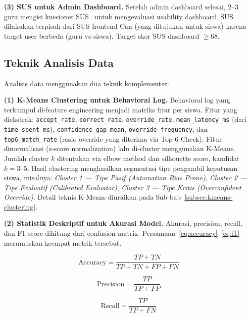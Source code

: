 \documentclass[12pt,a4paper,oneside,openany]{report}
\begin{document}
\textbf{(3) SUS untuk Admin Dashboard.} Setelah admin dashboard selesai, 2--3 guru mengisi kuesioner SUS~\cite{ref15}\cite{ref16} untuk mengevaluasi usability dashboard. SUS dilakukan terpisah dari SUS frontend Can (yang ditujukan untuk siswa) karena target user berbeda (guru vs siswa). Target skor SUS dashboard $\geq 68$.

\subsection{Teknik Analisis Data}
\label{subsec:teknik-analisis-data}

Analisis data menggunakan dua teknik komplementer:

\textbf{(1) K-Means Clustering untuk Behavioral Log.} Behavioral log yang terkumpul di-feature engineering menjadi matriks fitur per siswa. Fitur yang diekstrak: \texttt{accept\_rate}, \texttt{correct\_rate}, \texttt{override\_rate}, \texttt{mean\_latency\_ms} (dari \texttt{time\_spent\_ms}), \texttt{confidence\_gap\_mean}, \texttt{override\_frequency}, dan \texttt{top6\_match\_rate} (rasio override yang diterima via Top-6 Check). Fitur dinormalisasi (z-score normalization) lalu di-cluster menggunakan K-Means. Jumlah cluster $k$ ditentukan via elbow method dan silhouette score, kandidat $k = 3$--$5$. Hasil clustering menghasilkan segmentasi tipe pengambil keputusan siswa, misalnya: \textit{Cluster 1 --- Tipe Pasif (Automation Bias Prone)}, \textit{Cluster 2 --- Tipe Evaluatif (Calibrated Evaluator)}, \textit{Cluster 3 --- Tipe Kritis (Overconfident Override)}. Detail teknis K-Means diuraikan pada Sub-bab~\ref{subsec:kmeans-clustering}.

\textbf{(2) Statistik Deskriptif untuk Akurasi Model.} Akurasi, precision, recall, dan F1-score dihitung dari confusion matrix. Persamaan~\ref{eq:accuracy}--\ref{eq:f1} merumuskan keempat metrik tersebut.

\begin{equation}
\label{eq:accuracy}
\text{Accuracy} = \frac{TP + TN}{TP + TN + FP + FN}
\end{equation}

\begin{equation}
\label{eq:precision}
\text{Precision} = \frac{TP}{TP + FP}
\end{equation}

\begin{equation}
\label{eq:recall}
\text{Recall} = \frac{TP}{TP + FN}
\end{equation}
\end{document}
